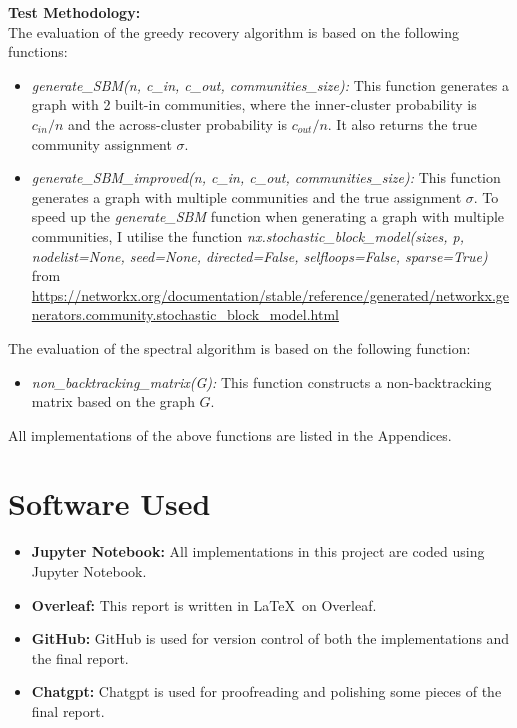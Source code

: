 \textbf{Test Methodology:}\\
The evaluation of the greedy recovery algorithm is based on the following functions:
\begin{itemize}
    \item \textit{generate\_SBM(n, c\_in, c\_out, communities\_size):}  This function generates a graph with 2 built-in communities, where the inner-cluster probability is $c_{in}/n$ and the across-cluster probability is $c_{out}/n$. It also returns the true community assignment $\sigma$.
    \item \textit{generate\_SBM\_improved(n, c\_in, c\_out, communities\_size):} This function generates a graph with multiple communities and the true assignment $\sigma$. To speed up the \textit{generate\_SBM} function when generating a graph with multiple communities, I utilise the function \textit{nx.stochastic\_block\_model(sizes, p, nodelist=None, seed=None, directed=False, selfloops=False, sparse=True)} from \url{https://networkx.org/documentation/stable/reference/generated/networkx.generators.community.stochastic_block_model.html}
\end{itemize}
The evaluation of the spectral algorithm is based on the following function:
\begin{itemize}
    \item \textit{non\_backtracking\_matrix(G):} This function constructs a non-backtracking matrix based on the graph $G$.
\end{itemize}
All implementations of the above functions are listed in the Appendices.

\section{Software Used}
\begin{itemize}
    \item \textbf{Jupyter Notebook:} All implementations in this project are coded using Jupyter Notebook.
    \item \textbf{Overleaf:} This report is written in \LaTeX~on Overleaf.
    \item \textbf{GitHub:} GitHub is used for version control of both the implementations and the final report.
    \item \textbf{Chatgpt:} Chatgpt is used for proofreading and polishing some pieces of the final report.
\end{itemize}

